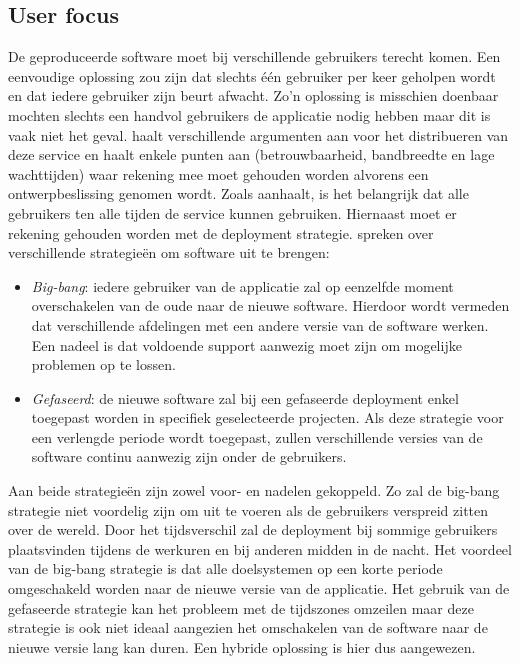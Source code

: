 \subsection{User focus}
De geproduceerde software moet bij verschillende gebruikers terecht komen.
Een eenvoudige oplossing zou zijn dat slechts één gebruiker per keer geholpen wordt en dat iedere gebruiker zijn beurt afwacht.
Zo'n oplossing is misschien doenbaar mochten slechts een handvol gebruikers de applicatie nodig hebben maar dit is vaak niet het geval.
\citet{patterson2008data} haalt verschillende argumenten aan voor het distribueren van deze service en haalt enkele punten aan (betrouwbaarheid, bandbreedte en lage wachttijden) waar rekening mee moet gehouden worden alvorens een ontwerpbeslissing genomen wordt.
Zoals \citet{patterson2008data} aanhaalt, is het belangrijk dat alle gebruikers ten alle tijden de service kunnen gebruiken.
Hiernaast moet er rekening gehouden worden met de deployment strategie.
\citet{munch2012software} spreken over verschillende strategieën om software uit te brengen:
\begin{itemize}
\item \emph{Big-bang}: iedere gebruiker van de applicatie zal op eenzelfde moment overschakelen van de oude naar de nieuwe software. 
Hierdoor wordt vermeden dat verschillende afdelingen met een andere versie van de software werken. 
Een nadeel is dat voldoende support aanwezig moet zijn om mogelijke problemen op te lossen.
\item \emph{Gefaseerd}: de nieuwe software zal bij een gefaseerde deployment enkel toegepast worden in specifiek geselecteerde projecten.
Als deze strategie voor een verlengde periode wordt toegepast, zullen verschillende versies van de software continu aanwezig zijn onder de gebruikers.
\end{itemize}
Aan beide strategieën zijn zowel voor- en nadelen gekoppeld.
Zo zal de big-bang strategie niet voordelig zijn om uit te voeren als de gebruikers verspreid zitten over de wereld.
Door het tijdsverschil zal de deployment bij sommige gebruikers plaatsvinden tijdens de werkuren en bij anderen midden in de nacht.
Het voordeel van de big-bang strategie is dat alle doelsystemen op een korte periode omgeschakeld worden naar de nieuwe versie van de applicatie. 
Het gebruik van de gefaseerde strategie kan het probleem met de tijdszones omzeilen maar deze strategie is ook niet ideaal aangezien het omschakelen van de software naar de nieuwe versie lang kan duren.
Een hybride oplossing is hier dus aangewezen.

